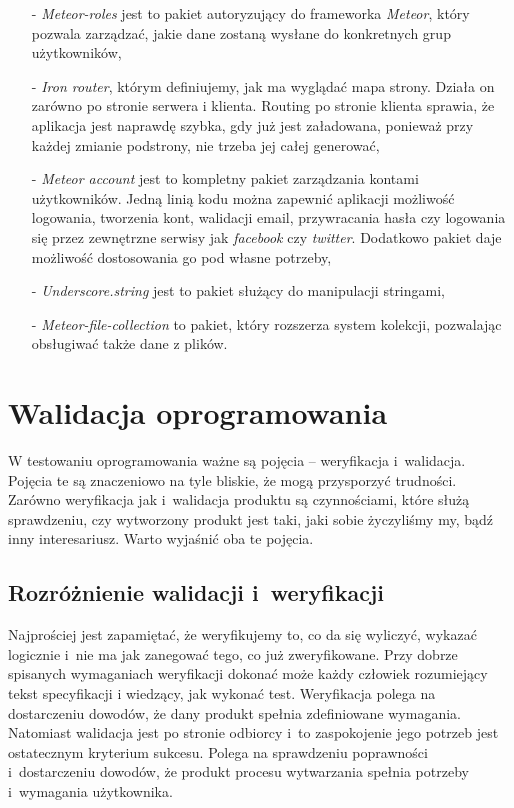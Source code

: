 \documentclass[openright]{xmgr}
\begin{document}
\begin{itemize}
\item[-] \textit{Meteor-roles} jest to pakiet autoryzujący do frameworka \textit{Meteor}, który pozwala zarządzać, jakie dane zostaną wysłane do konkretnych grup użytkowników,
\item[-] \textit{Iron router}, którym definiujemy, jak ma wyglądać mapa strony. Działa on zarówno po stronie serwera i klienta. Routing po stronie klienta sprawia, że aplikacja jest naprawdę szybka, gdy już jest załadowana, ponieważ przy każdej zmianie podstrony, nie trzeba jej całej generować,
\item[-] \textit{Meteor account} jest to kompletny pakiet zarządzania kontami użytkowników. Jedną linią kodu można zapewnić aplikacji możliwość logowania, tworzenia kont, walidacji email, przywracania hasła czy logowania się przez zewnętrzne serwisy jak \textit{facebook} czy \textit{twitter}. Dodatkowo pakiet daje możliwość dostosowania go pod własne potrzeby,
\item[-] \textit{Underscore.string} jest to pakiet służący do manipulacji stringami,
\item[-] \textit{Meteor-file-collection} to pakiet, który rozszerza system kolekcji, pozwalając obsługiwać także dane z plików.
\end{itemize}



\chapter{Walidacja oprogramowania}

\indent \indent \indent W testowaniu oprogramowania ważne są pojęcia – weryfikacja i~walidacja. Pojęcia te są znaczeniowo na tyle bliskie, że mogą przysporzyć trudności. Zarówno weryfikacja jak i~walidacja produktu są czynnościami, które służą sprawdzeniu, czy wytworzony produkt jest taki, jaki sobie życzyliśmy my, bądź inny interesariusz. Warto wyjaśnić oba te pojęcia.

\section{Rozróżnienie walidacji i~weryfikacji}

Najprościej jest zapamiętać, że weryfikujemy to, co da się wyliczyć, wykazać logicznie i~nie ma jak zanegować tego, co już zweryfikowane. Przy dobrze spisanych wymaganiach weryfikacji dokonać może każdy człowiek rozumiejący tekst specyfikacji i wiedzący, jak wykonać test. Weryfikacja polega na dostarczeniu dowodów, że dany produkt spełnia zdefiniowane wymagania. Natomiast walidacja jest po stronie odbiorcy i~to zaspokojenie jego potrzeb jest ostatecznym kryterium sukcesu. Polega na sprawdzeniu poprawności i~dostarczeniu dowodów,  że produkt procesu wytwarzania spełnia potrzeby i~wymagania użytkownika.\cite{ALTKOM}
\end{document}
